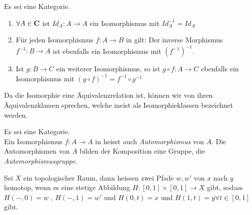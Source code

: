 \documentclass{article}
\renewcommand{\id}{\ensuremath{Id}}
\begin{document}
		\begin{lem}
		   \cite[Lemma 2.3.9]{Bra}
		  Es sei \CatC eine Kategorie.
		\begin{enumerate}
			  \item \( \forall A \in \mathbf{C} \) ist \( \id_A :A \to A  \) ein Isomorphismus mit \( \id_A^{-1}=\id_A \)
			  \item F\"ur jeden Isomorphismus \( f: A \to B \) in \CatC gilt: Der inverse Morphismus \(f^{-1}: B \to A \) ist ebenfalls ein Isomorphismus mit \( \left( f^{-1} \right)^{-1} \).
			  \item Ist \(g: B \to C \) ein weiterer Isomorphismus, so ist \( g \circ f :A \to C \) ebenfalls ein Isomorphismus mit \( \left( g \circ f \right)^{-1} =f^{-1} \circ g^{-1} \)  
		  \end{enumerate}
		  	\end{lem}
		  	
		\begin{defi}[Isomorphieklassen]
			\cite[Definition 2.3.10]{Bra}
		 Da die Isomorphie eine \"Aquivalenzrelation ist, k\"onnen wir von ihren \"Aquivalenzklassen sprechen, welche meist als Isomorphieklassen bezeichnet werden.
		\end{defi}
		 
		 
		\begin{defi}[Automorphismengruppen]
		\cite[Definition 2.3.13]{Bra}
		 Es sei \CatC eine Kategorie.  \\
		 Ein Isomorphismus \( f:A \to A \) in \CatC heisst auch \emph{Automorphismus} von $A$. 
		 Die Automorphismen von $A$ bilden \bzgl der Komposition eine Gruppe, die \emph{Automorphismusgruppe}.
		\end{defi}
		
		\begin{defi}[Homotopieklasse]
			\cite[Aufgabe 2.24]{Bra}
		 	Sei \( X \) ein topologischer Raum, dann heissen zwei Pfade \( w,w'  \) von \(x \) nach \( y \) homotop, 
			wenn es eine stetige Abbildung \( H : [0,1] \times [0,1 ] \to X \) gibt, 
			sodass \( H(-,0) = w \) , \( H( -,1) =w' \) und \( H(0,t) =x \) und \(H(1,t) = y \forall t \in [0,1] \) gibt.
		\end{defi}
		 
\end{document}
